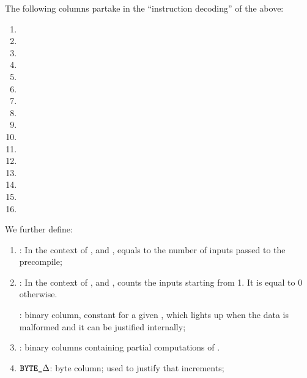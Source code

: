 The following columns partake in the ``instruction decoding'' of the above:
\begin{multicols}{2}
      \begin{enumerate}
        \item \isPointEvaluationData
        \item \isPointEvaluationResult

        \item \isBlsGOneAddData             
        \item \isBlsGOneAddResult           
             
        \item \isBlsGOneMsmData             
        \item \isBlsGOneMsmResult 

        \item \isBlsGTwoAddData             
        \item \isBlsGTwoAddResult   

        \item \isBlsGTwoMsmData
        \item \isBlsGTwoMsmResult

        \item \isBlsPairingCheckData
        \item \isBlsPairingCheckResult          
      
        \item \isBlsMapFpToGOneData         
        \item \isBlsMapFpToGOneResult       
      
        \item \isBlsMapFpTwoToGTwoData         
        \item \isBlsMapFpTwoToGTwoResult
      \end{enumerate}
\end{multicols}

We further define: 

\begin{enumerate}[resume]
  \item \totalInputs:
        In the context of ,  and , equals to the number of inputs passed to the precompile;
  \item \accInputs: In the context of ,  and , counts the inputs starting from 1. It is equal to 0 otherwise.
  
  \both{\malformedDataInternalJustification}:
        binary column, constant for a given \blsId, which lights up when the data is malformed and it can be justified internally;

  \item \both{\partialChecks}:
        binary columns containing partial computations of \malformedDataInternalJustification{}.
  \item $\texttt{BYTE}\texttt{\_$\Delta$}$:
        byte column; used to justify that \blsId{} increments;
\end{enumerate}

